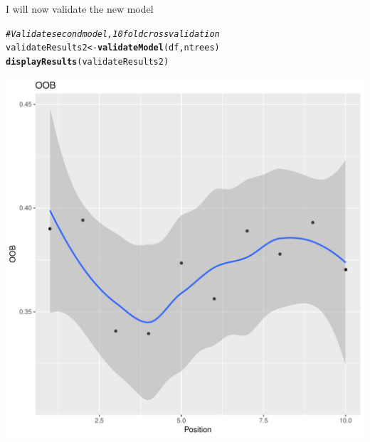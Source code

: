 \documentclass{article}\usepackage[]{graphicx}\usepackage[]{color}
\makeatletter
\def\maxwidth{ %
  \ifdim\Gin@nat@width>\linewidth
    \linewidth
  \else
    \Gin@nat@width
  \fi
}
\newcommand{\hlcom}[1]{\textcolor[rgb]{0.678,0.584,0.686}{\textit{#1}}}%
\newcommand{\hlstd}[1]{\textcolor[rgb]{0.345,0.345,0.345}{#1}}%
\newcommand{\hlkwb}[1]{\textcolor[rgb]{0.69,0.353,0.396}{#1}}%
\newcommand{\hlkwd}[1]{\textcolor[rgb]{0.737,0.353,0.396}{\textbf{#1}}}%
\newenvironment{kframe}{%
 \def\at@end@of@kframe{}%
 \ifinner\ifhmode%
  \def\at@end@of@kframe{\end{minipage}}%
  \begin{minipage}{\columnwidth}%
 \fi\fi%
 \def\FrameCommand##1{\hskip\@totalleftmargin \hskip-\fboxsep
 \colorbox{shadecolor}{##1}\hskip-\fboxsep
     \hskip-\linewidth \hskip-\@totalleftmargin \hskip\columnwidth}%
 \MakeFramed {\advance\hsize-\width
   \@totalleftmargin\z@ \linewidth\hsize
   \@setminipage}}%
 {\par\unskip\endMakeFramed%
 \at@end@of@kframe}
\newenvironment{knitrout}{}{} %
\makeatother
\begin{document}
I will now validate the new model
\begin{knitrout}
\color{fgcolor}\begin{kframe}
\begin{alltt}
\hlcom{#Validate second model, 10 fold cross validation }
\hlstd{validateResults2}\hlkwb{<-}\hlkwd{validateModel}\hlstd{(df,ntrees)}
\hlkwd{displayResults}\hlstd{(validateResults2)}
\end{alltt}


{\ttfamily\noindent\itshape\color{messagecolor}{\#\# `geom\_smooth()` using method = 'loess'}}\end{kframe}
\includegraphics[width=\maxwidth]{figure/unnamed-chunk-35-1} 
\begin{kframe}


\end{kframe}
\end{knitrout}
\end{document}
